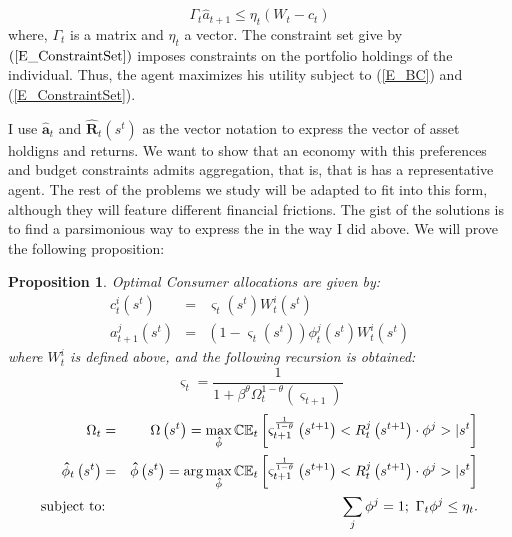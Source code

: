 \documentclass{article}
\newtheorem{proposition}[theorem]{Proposition}
\begin{document}
\begin{equation}
\Gamma _{t}\hat{a}_{t+1}\leq \eta _{t}\left( W_{t}-c_{t}\right)
\label{E_ConstraintSet}
\end{equation}%
where, $\Gamma _{t}$ is a matrix and $\eta _{t}$ a vector. The constraint
set give by $\left( \ref{E_ConstraintSet}\right) $ imposes constraints on
the portfolio holdings of the individual. Thus, the agent maximizes his
utility subject to (\ref{E_BC}) and (\ref{E_ConstraintSet}).

I use $\mathbf{\hat{a}}_{t}$ and $\mathbf{\hat{R}}_{t}\left( s^{t}\right) $
as the vector notation to express the vector of asset holdigns and returns.
We want to show that an economy with this preferences and budget constraints
admits aggregation, that is, that is has a representative agent. The rest of
the problems we study will be adapted to fit into this form, although they
will feature different financial frictions. The gist of the solutions is to
find a parsimonious way to express the in the way I did above. We will prove
the following proposition:

\begin{proposition}
Optimal Consumer allocations are given by:%
\begin{eqnarray*}
c_{t}^{i}\left( s^{t}\right)  &=&\varsigma _{t}\left( s^{t}\right)
W_{t}^{i}\left( s^{t}\right)  \\
a_{t+1}^{j}\left( s^{t}\right)  &=&\left( 1-\varsigma _{t}\left(
s^{t}\right) \right) \phi _{t}^{j}\left( s^{t}\right) W_{t}^{i}\left(
s^{t}\right)
\end{eqnarray*}%
where $W_{t}^{i}$ is defined above, and the following recursion is obtained:%
\begin{equation*}
\varsigma _{t}=\frac{1}{1+\beta ^{\theta }\Omega _{t}^{1-\theta }\left(
\varsigma _{t+1}\right) }
\end{equation*}%
\begin{eqnarray*}
\Omega _{t} &=&\Omega \left( s^{t}\right) =\max_{\mathbf{\hat{\phi}}}\mathbb{%
CE}_{t}\left[ \varsigma _{t+1}^{\frac{1}{1-\theta }}\left( s^{t+1}\right)
<R_{t}^{j}\left( s^{t+1}\right) \cdot \phi ^{j}>|s^{t}\right]  \\
\mathbf{\hat{\phi}}_{t}\left( s^{t}\right)  &=&\mathbf{\hat{\phi}}\left(
s^{t}\right) =\arg \max_{\mathbf{\hat{\phi}}}\mathbb{CE}_{t}\left[ \varsigma
_{t+1}^{\frac{1}{1-\theta }}\left( s^{t+1}\right) <R_{t}^{j}\left(
s^{t+1}\right) \cdot \phi ^{j}>|s^{t}\right]  \\
\text{subject to} &\text{:}&\sum_{j}\phi ^{j}=1;\text{ }\Gamma _{t}\phi
^{j}\leq \eta _{t}.
\end{eqnarray*}
\end{proposition}
\end{document}
